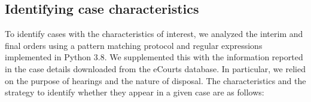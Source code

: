 \documentclass[12pt,a4paper]{article}
\begin{document}
	
	
	\subsection{Identifying case characteristics} \label{sec:text-mining}
	
	
	To identify cases with the characteristics of interest, we analyzed the interim and final orders using a pattern matching protocol and regular expressions implemented in Python 3.8. We supplemented this with the information reported in the case details downloaded from the eCourts database. In particular, we relied on the purpose of hearings and the nature of disposal. The characteristics and the strategy to identify whether they appear in a given case are as follows:
	
\end{document}
